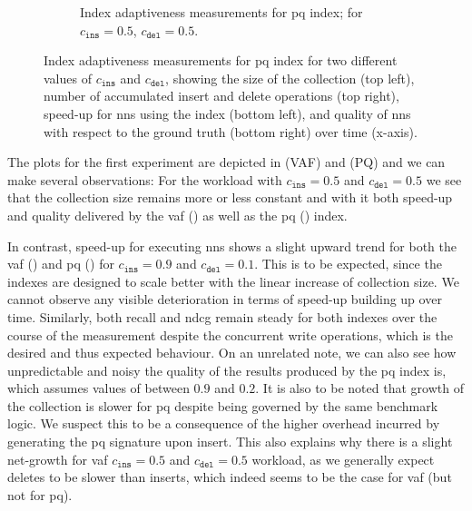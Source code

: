 \begin{figure}[p]
\begin{subfigure}[b]{\textwidth}
        \caption{Index adaptiveness measurements for \acrshort{pq} index; for $c_{\texttt{ins}} = 0.5$, $c_{\texttt{del}} = 0.5$.}
        \label{figure:index_adaptiveness_pq_50_50}
    \end{subfigure}
    \caption{Index adaptiveness measurements for \acrshort{pq} index for two different values of $c_{\texttt{ins}}$ and $c_{\texttt{del}}$, showing the size of the collection (top left), number of accumulated insert and delete operations (top right), speed-up for \acrshort{nns} using the index (bottom left), and quality of \acrshort{nns} with respect to the ground truth (bottom right) over time (x-axis).}
    \label{figure:index_adaptiveness_pq}
\end{figure}

The plots for the first experiment are depicted in  (VAF) and  (PQ) and we can make several observations: For the workload with $c_{\texttt{ins}} = 0.5$ and $c_{\texttt{del}} = 0.5$ we see that the collection size remains more or less constant and with it both speed-up and quality delivered by the \acrshort{vaf} () as well as the \acrshort{pq} () index.

In contrast, speed-up for executing \acrshort{nns} shows a slight upward trend for both the \acrshort{vaf} () and \acrshort{pq} () for $c_{\texttt{ins}} = 0.9$ and $c_{\texttt{del}} = 0.1$. This is to be expected, since the indexes are designed to scale better with the linear increase of collection size. We cannot observe any visible deterioration in terms of speed-up building up over time. Similarly, both recall and \acrshort{ndcg} remain steady for both indexes over the course of the measurement despite the concurrent write operations, which is the desired and thus expected behaviour. On an unrelated note, we can also see how unpredictable and noisy the quality of the results produced by the \acrshort{pq} index is, which assumes values of between $0.9$ and $0.2$. It is also to be noted that growth of the collection is slower for \acrshort{pq} despite being governed by the same benchmark logic. We suspect this to be a consequence of the higher overhead incurred by generating the \acrshort{pq} signature upon insert. This also explains why there is a slight net-growth for \acrshort{vaf} $c_{\texttt{ins}} = 0.5$ and $c_{\texttt{del}} = 0.5$ workload, as we generally expect deletes to be slower than inserts, which indeed seems to be the case for \acrshort{vaf} (but not for \acrshort{pq}).

